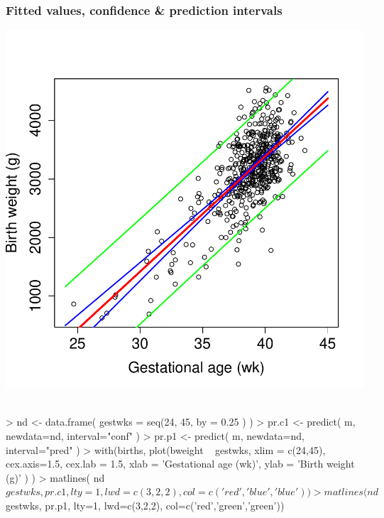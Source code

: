 \documentclass[12pt,dvipsnames,t,handout%
,aspectratio=169%
]{beamer}
\begin{document}
\begin{frame}[fragile]
\frametitle{Fitted values, confidence \& prediction intervals}
\includegraphics[height=0.65\textheight,keepaspectratio]{lm-bw-by-gw-pr1}
\ \\[-2em]
{\scriptsize
\begin{Schunk}
\begin{Sinput}
> nd <- data.frame( gestwks = seq(24, 45, by = 0.25 ) )
> pr.c1 <- predict( m, newdata=nd, interval="conf" )
> pr.p1 <- predict( m, newdata=nd, interval="pred" )
> with(births, plot(bweight ~ gestwks, xlim = c(24,45), cex.axis=1.5, cex.lab = 1.5, xlab = 'Gestational age (wk)', ylab = 'Birth weight (g)'   ) )
> matlines( nd$gestwks, pr.c1, lty=1, lwd=c(3,2,2), col=c('red','blue','blue')) 
> matlines( nd$gestwks, pr.p1, lty=1, lwd=c(3,2,2), col=c('red','green','green'))
\end{Sinput}
\end{Schunk}
}
\end{frame}
\end{document}

